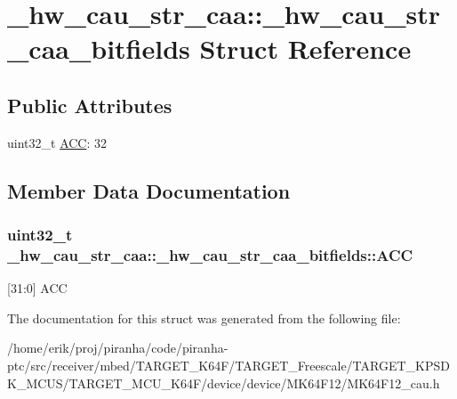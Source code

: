 \hypertarget{struct__hw__cau__str__caa_1_1__hw__cau__str__caa__bitfields}{}\section{\+\_\+hw\+\_\+cau\+\_\+str\+\_\+caa\+:\+:\+\_\+hw\+\_\+cau\+\_\+str\+\_\+caa\+\_\+bitfields Struct Reference}
\label{struct__hw__cau__str__caa_1_1__hw__cau__str__caa__bitfields}
\subsection*{Public Attributes}
\begin{DoxyCompactItemize}
\item 
uint32\+\_\+t \hyperlink{struct__hw__cau__str__caa_1_1__hw__cau__str__caa__bitfields_acae06440bc0285ecd69b830b845c30d9}{A\+CC}\+: 32
\end{DoxyCompactItemize}


\subsection{Member Data Documentation}
\subsubsection[{\texorpdfstring{A\+CC}{ACC}}]{\setlength{\rightskip}{0pt plus 5cm}uint32\+\_\+t \+\_\+hw\+\_\+cau\+\_\+str\+\_\+caa\+::\+\_\+hw\+\_\+cau\+\_\+str\+\_\+caa\+\_\+bitfields\+::\+A\+CC}\hypertarget{struct__hw__cau__str__caa_1_1__hw__cau__str__caa__bitfields_acae06440bc0285ecd69b830b845c30d9}{}\label{struct__hw__cau__str__caa_1_1__hw__cau__str__caa__bitfields_acae06440bc0285ecd69b830b845c30d9}
\mbox{[}31\+:0\mbox{]} A\+CC 

The documentation for this struct was generated from the following file\+:\begin{DoxyCompactItemize}
\item 
/home/erik/proj/piranha/code/piranha-\/ptc/src/receiver/mbed/\+T\+A\+R\+G\+E\+T\+\_\+\+K64\+F/\+T\+A\+R\+G\+E\+T\+\_\+\+Freescale/\+T\+A\+R\+G\+E\+T\+\_\+\+K\+P\+S\+D\+K\+\_\+\+M\+C\+U\+S/\+T\+A\+R\+G\+E\+T\+\_\+\+M\+C\+U\+\_\+\+K64\+F/device/device/\+M\+K64\+F12/M\+K64\+F12\+\_\+cau.\+h\end{DoxyCompactItemize}
